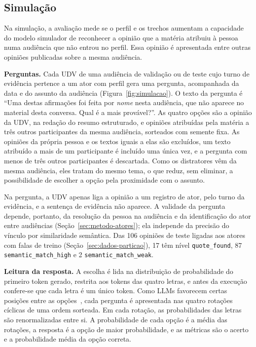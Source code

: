 \subsection{Simulação}
\label{sec:setup-simulacao}



Na simulação, a avaliação mede se o perfil e os trechos aumentam a capacidade do modelo simulador de
reconhecer a opinião que a matéria atribuiu à pessoa numa audiência que não entrou no perfil. Essa
opinião é apresentada entre outras opiniões publicadas sobre a mesma audiência.

\textbf{Perguntas.} Cada UDV de uma audiência de validação ou de teste cujo turno de evidência
pertence a um ator com perfil gera uma pergunta, acompanhada da data e do assunto da audiência (Figura~\ref{fig:simulacao}). O
texto da pergunta é ``Uma destas afirmações foi feita por \textit{nome} nesta audiência, que não
aparece no material desta conversa. Qual é a mais provável?''. As quatro opções são a opinião da
UDV, na redação do resumo estruturado, e opiniões atribuídas pela matéria a três outros participantes
da mesma audiência, sorteados com semente fixa. As opiniões da própria pessoa e os textos iguais a
elas são excluídos, um texto atribuído a mais de um participante é incluído uma única vez, e a
pergunta com menos de três outros participantes é descartada. Como os distratores vêm da mesma
audiência, eles tratam do mesmo tema, o que reduz, sem eliminar, a possibilidade de escolher a opção
pela proximidade com o assunto.

Na pergunta, a UDV apenas liga a opinião a um registro de ator, pelo turno da evidência, e a
sentença de evidência não aparece. A validade da pergunta depende, portanto, da resolução da pessoa
na audiência e da identificação do ator entre audiências (Seção~\ref{sec:metodo-atores}); ela
independe da precisão do vínculo por similaridade semântica. Das 106 opiniões de teste ligadas aos
atores com falas de treino (Seção~\ref{sec:dados-particao}), 17 têm nível \texttt{quote\_found}, 87
\texttt{semantic\_match\_high} e 2 \texttt{semantic\_match\_weak}.

\textbf{Leitura da resposta.} A escolha é lida na distribuição de probabilidade do primeiro token
gerado, restrita aos tokens das quatro letras, e antes da execução confere-se que cada letra é um
único token. Como LLMs favorecem certas posições entre as
opções~\citep{zheng2024large,pezeshkpour2024large}, cada pergunta é apresentada nas quatro rotações
cíclicas de uma ordem sorteada. Em cada rotação, as probabilidades das letras são renormalizadas
entre si. A probabilidade de cada opção é a
média das rotações, a resposta é a opção de maior probabilidade, e as métricas são o acerto e a
probabilidade média da opção correta.

